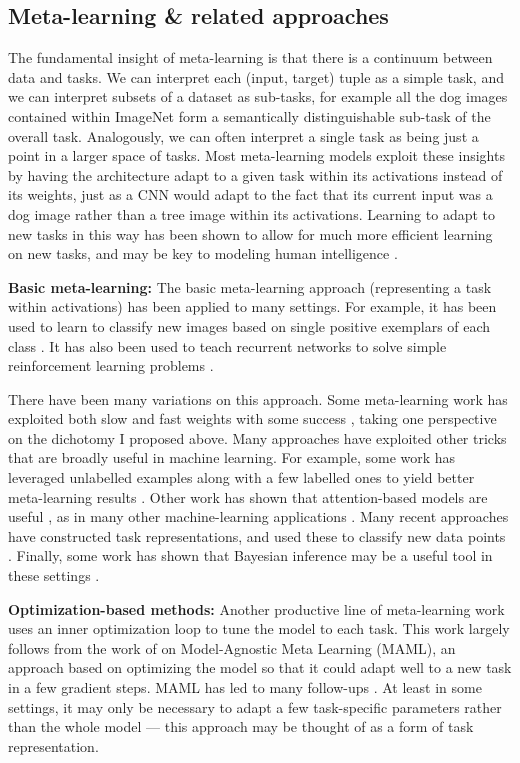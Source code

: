 \subsection{Meta-learning \& related approaches} \label{meta_learning_sec}

The fundamental insight of meta-learning is that there is a continuum between data and tasks. We can interpret each (input, target) tuple as a simple task, and we can interpret subsets of a dataset as sub-tasks, for example all the dog images contained within ImageNet form a semantically distinguishable sub-task of the overall task. Analogously, we can often interpret a single task as being just a point in a larger space of tasks. Most meta-learning models exploit these insights by having the architecture adapt to a given task within its activations instead of its weights, just as a CNN would adapt to the fact that its current input was a dog image rather than a tree image within its activations. Learning to adapt to new tasks in this way has been shown to allow for much more efficient learning on new tasks, and may be key to modeling human intelligence \citep{Hansen2017}. \par 
\textbf{Basic meta-learning:}
The basic meta-learning approach (representing a task within activations) has been applied to many settings. For example, it has been used to learn to classify new images based on single positive exemplars of each class \citep{Vinyals2016, Ravi2017}. It has also been used to teach recurrent networks to solve simple reinforcement learning problems \citep{Duan2016, Wang2016a, Stadie2018}. \par
There have been many variations on this approach. Some meta-learning work has exploited both slow and fast weights with some success \citep[e.g.][]{Munkhdalai2017}, taking one perspective on the dichotomy I proposed above. Many approaches have exploited other tricks that are broadly useful in machine learning. For example, some work has leveraged unlabelled examples along with a few labelled ones to yield better meta-learning results \citep[e.g.][]{Ren2018}. Other work has shown that attention-based models are useful \citep{Reed2017}, as in many other machine-learning applications \citep[e.g.][]{Vaswani, Gregor2015}. Many recent approaches have constructed task representations, and used these to classify new data points \citep{Li2019a,Ravichandran2019}. Finally, some work has shown that Bayesian inference may be a useful tool in these settings \citep{Burgess2016}. \par
\textbf{Optimization-based methods:} Another productive line of meta-learning work uses an inner optimization loop to tune the model to each task. This work largely follows from the work of \citet{Finn2017a} on Model-Agnostic Meta Learning (MAML), an approach based on optimizing the model so that it could adapt well to a new task in a few gradient steps. MAML has led to many follow-ups \citep[e.g.][]{Finn2017, Finn2018, Nichol2018}. At least in some settings, it may only be necessary to adapt a few task-specific parameters rather than the whole model \citep{Zintgraf2018} --- this approach may be thought of as a form of task representation. \par

